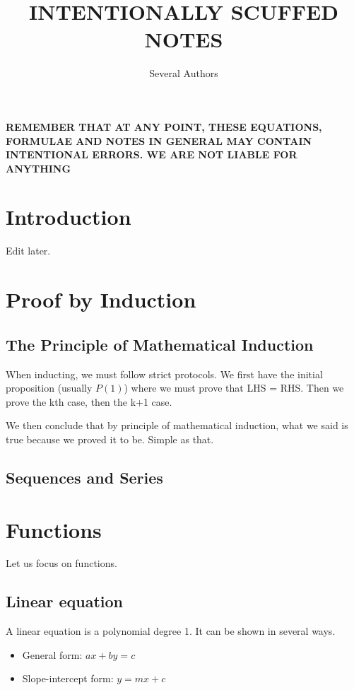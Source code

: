 \documentclass[a4paper]{article}
\theoremstyle{definition}
\newcommand{\sectionSpace}{\vspace{2em}} %
\newcommand{\subsectionSpace}{\vspace{0.5em}}
\begin{document}
\title{INTENTIONALLY SCUFFED NOTES}
\author{Several Authors}
\maketitle
\newpage



\begin{center}
    \Large 
    \textbf{
        REMEMBER THAT AT ANY POINT, THESE EQUATIONS, FORMULAE AND NOTES IN GENERAL MAY CONTAIN INTENTIONAL ERRORS. WE ARE NOT LIABLE FOR ANYTHING} 
\end{center}

\sectionSpace
\section{Introduction}
    Edit later.



\sectionSpace
\section{Proof by Induction}
    \subsection{The Principle of Mathematical Induction}
    When inducting, we must follow strict protocols. We first have the initial proposition (usually $P(1)$) where we must prove that LHS = RHS. Then we prove the kth case, then the k+1 case. 

    We then conclude that by principle of mathematical induction, what we said is true because we proved it to be. Simple as that.

    \subsectionSpace
    \subsection{Sequences and Series}



\sectionSpace
\section{Functions}
Let us focus on functions. 
    \subsection{Linear equation}
    A linear equation is a polynomial degree 1. It can be shown in several ways.
    \begin{itemize}
        \item General form: $ax + by = c$
        \item Slope-intercept form: $y = mx + c$
    \end{itemize}
\end{document}
